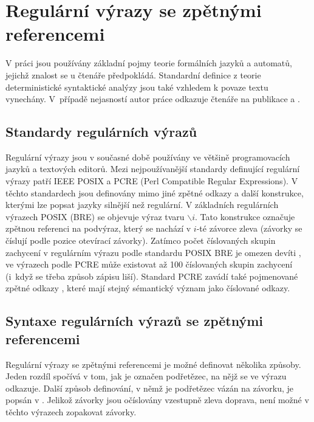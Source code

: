 \documentclass[thesis=B,czech]{FITthesis}[2019/12/23]
\theoremstyle{definition}
\begin{document}
\chapter{Regulární výrazy se zpětnými referencemi}

V práci jsou používány základní pojmy teorie formálních jazyků a automatů, jejichž znalost se u čtenáře předpokládá. Standardní definice z teorie deterministické syntaktické analýzy jsou také vzhledem k povaze textu vynechány. V~případě nejasností autor práce odkazuje čtenáře na publikace \cite{hopcroft} a \cite{aho_lam_sethi_ullman_2007}.
\section{Standardy regulárních výrazů}
Regulární výrazy jsou v současné době používány ve většině programovacích jazyků a textových editorů. Mezi nejpoužívanější standardy definující regulární výrazy patří IEEE POSIX a PCRE (Perl Compatible Regular Expressions). V těchto standardech jsou definovány mimo jiné zpětné odkazy a další konstrukce, kterými lze popsat jazyky silnější než regulární. V základních regulárních výrazech POSIX (BRE) se objevuje výraz tvaru $\backslash i$. Tato konstrukce označuje zpětnou referenci na podvýraz, který se nachází v $i$-té závorce zleva (závorky se číslují podle pozice otevírací závorky). Zatímco počet číslovaných skupin zachycení v regulárním výrazu podle standardu POSIX BRE je omezen devíti \cite[s. 233]{posix}, ve výrazech podle PCRE může existovat až 100 číslovaných skupin zachycení (i~když se třeba způsob zápisu liší). Standard PCRE zavádí také pojmenované zpětné odkazy \cite{pcre}, které mají stejný sémantický význam jako číslované odkazy.
\section{Syntaxe regulárních výrazů se zpětnými referencemi}

Regulární výrazy se zpětnými referencemi je možné definovat několika způsoby. Jeden rozdíl spočívá v tom, jak je označen podřetězec, na nějž se ve výrazu odkazuje. Další způsob definování, v němž je podřetězec vázán na závorku, je popsán v \cite{campeanu}. Jelikož závorky jsou očíslovány vzestupně zleva doprava, není možné v těchto výrazech zopakovat  závorky.
\end{document}
